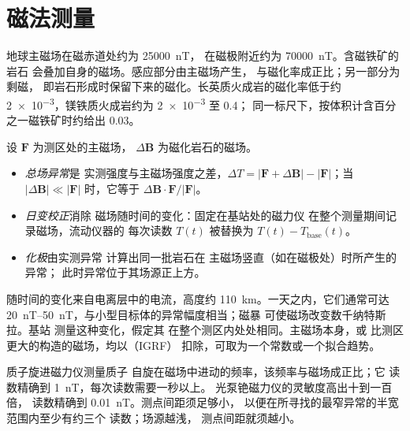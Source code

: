 \section{磁法测量}\label{sec:b3:field-lab-methods-3:magnetics}

地球主磁场在磁赤道处约为 \qty{25000}{nT}，
在磁极附近约为 \qty{70000}{nT}。含磁铁矿的岩石
会叠加自身的磁场。感应部分由主磁场产生，
与磁化率成正比；另一部分为剩磁，
即岩石形成时保留下来的磁化。长英质火成岩的磁化率低于约
\num{2e-3}，镁铁质火成岩约为 \num{2e-3} 至 \num{0.4}；
同一标尺下，按体积计含百分之一磁铁矿时约给出 \num{0.03}。

\begin{definition}\label{def:b3:field-lab-methods-3:magnetic}
设 $\mathbf{F}$ 为测区处的主磁场，
$\Delta\mathbf{B}$ 为磁化岩石的磁场。
  \begin{itemize}
  \item \emph{总场异常}是
        实测强度与主磁场强度之差，$\Delta T =
        |\mathbf{F} + \Delta\mathbf{B}| - |\mathbf{F}|$；当
        $|\Delta\mathbf{B}| \ll |\mathbf{F}|$ 时，它等于
        $\Delta\mathbf{B}\cdot\mathbf{F}/|\mathbf{F}|$。
  \item \emph{日变校正}消除
        磁场随时间的变化：固定在基站处的磁力仪
        在整个测量期间记录磁场，流动仪器的
        每次读数 $T(t)$ 被替换为 $T(t) -
        T_\mathrm{base}(t)$。
  \item \emph{化极}由实测异常
        计算出同一批岩石在
        主磁场竖直（如在磁极处）时所产生的异常；
        此时异常位于其场源正上方。
\end{itemize}
\end{definition}

随时间的变化来自电离层中的电流，高度约
\qty{110}{km}。一天之内，它们通常可达
\qtyrange{20}{50}{nT}，与小型目标体的异常幅度相当；磁暴
可使磁场改变数千纳特斯拉。基站
测量这种变化，假定其
在整个测区内处处相同。主磁场本身，或
比测区更大的构造的磁场，均以（IGRF）
扣除，可取为一个常数或一个拟合趋势。

质子旋进磁力仪测量质子
自旋在磁场中进动的频率，该频率与磁场成正比；它
读数精确到 \qty{1}{nT}，每次读数需要一秒以上。
光泵铯磁力仪的灵敏度高出十到一百倍，
读数精确到 \qty{0.01}{nT}。测点间距须足够小，
以便在所寻找的最窄异常的半宽范围内至少有约三个
读数；场源越浅，
测点间距就须越小。

